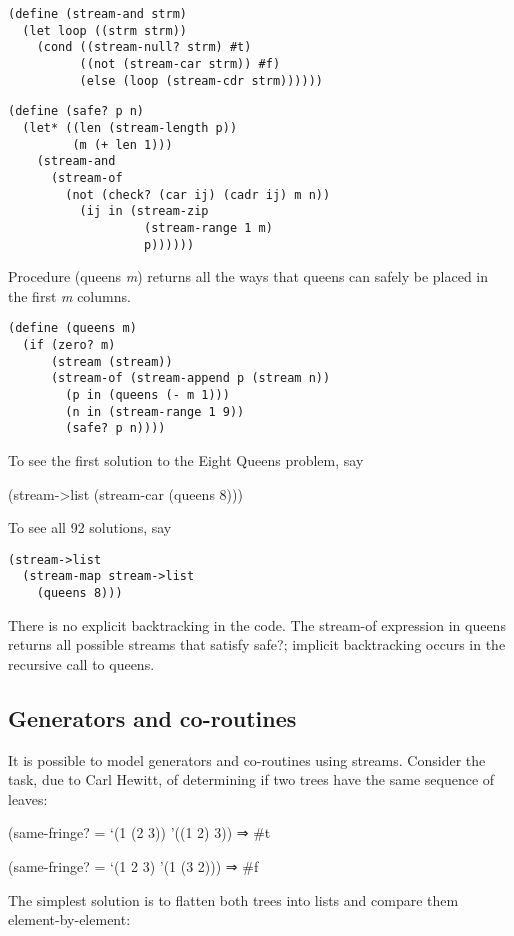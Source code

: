 \begin{verbatim}
(define (stream-and strm)
  (let loop ((strm strm))
    (cond ((stream-null? strm) #t)
          ((not (stream-car strm)) #f)
          (else (loop (stream-cdr strm))))))
\end{verbatim}

\begin{verbatim}
(define (safe? p n)
  (let* ((len (stream-length p))
         (m (+ len 1)))
    (stream-and
      (stream-of
        (not (check? (car ij) (cadr ij) m n))
          (ij in (stream-zip
                   (stream-range 1 m)
                   p))))))
\end{verbatim}

Procedure (queens \emph{m}) returns all the ways that queens can safely
be placed in the first \emph{m} columns.

\begin{verbatim}
(define (queens m)
  (if (zero? m)
      (stream (stream))
      (stream-of (stream-append p (stream n))
        (p in (queens (- m 1)))
        (n in (stream-range 1 9))
        (safe? p n))))
\end{verbatim}

To see the first solution to the Eight Queens problem, say

(stream->list (stream-car (queens 8)))

To see all 92 solutions, say

\begin{verbatim}
(stream->list
  (stream-map stream->list
    (queens 8)))
\end{verbatim}

There is no explicit backtracking in the code. The stream-of expression
in queens returns all possible streams that satisfy safe?; implicit
backtracking occurs in the recursive call to queens.

\subsection{Generators and
co-routines}\label{generators-and-co-routines}

It is possible to model generators and co-routines using streams.
Consider the task, due to Carl Hewitt, of determining if two trees have
the same sequence of leaves:

(same-fringe? = `(1 (2 3)) '((1 2) 3)) ⇒ \#t

(same-fringe? = `(1 2 3) '(1 (3 2))) ⇒ \#f

The simplest solution is to flatten both trees into lists and compare
them element-by-element:

